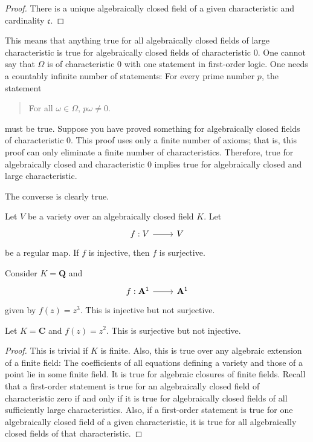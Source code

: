\documentclass [11 pt, oneside] {article}
\begin{document}
\begin{proof}
There is a unique algebraically closed field of a given characteristic and cardinality $\mathfrak{c}$.
\end{proof}

\begin{remark}
	This means that anything true for all algebraically closed fields of large characteristic is true for algebraically closed fields of characteristic $0$. One cannot say that $\Omega$ is of characteristic $0$ with one statement in first-order logic. One needs a countably infinite number of statements: For every prime number $p$, the statement
	\begin{quote}
		\small 
		For all $\omega\in \Omega$, $p\omega\ne 0$.
	\end{quote}
	must be true. Suppose you have proved something for algebraically closed fields of characteristic $0$. This proof uses only a finite number of axioms; that is, this proof can only eliminate a finite number of characteristics. Therefore, true for algebraically closed and characteristic $0$ implies true for algebraically closed and large characteristic.

	The converse is clearly true.
\end{remark}

\begin{theorem}[Ax--Grothendieck]\label{}
Let $V$ be a variety over an algebraically closed field $K$. Let 
\[
\begin{tikzcd}
f:V\ar[r]& V
\end{tikzcd}
\]
be a regular map. If $f$ is injective, then $f$ is surjective.
\end{theorem}

\begin{example}\label{}
Consider $K= \mathbf{Q}$ and 
\[
\begin{tikzcd}
f:\mathbf{A}^1\ar[r]& \mathbf{A}^1
\end{tikzcd}
\]
given by $f(z)=z^ 3$. This is injective but not surjective.
\end{example}

\begin{example}\label{}
Let $K=\mathbf{C}$ and $f(z)=z^2$. This is surjective but not injective.
\end{example}

\begin{proof}
This is trivial if $K$ is finite. Also, this is true over any algebraic extension of a finite field: The coefficients of all equations defining a variety and those of a point lie in some finite field. It is true for algebraic closures of finite fields. Recall that a first-order statement is true for an algebraically closed field of characteristic zero if and only if it is true for algebraically closed fields of all sufficiently large characteristics. Also, if a first-order statement is true for one algebraically closed field of a given characteristic, it is true for all algebraically closed fields of that characteristic.
\end{proof}
\end{document}
